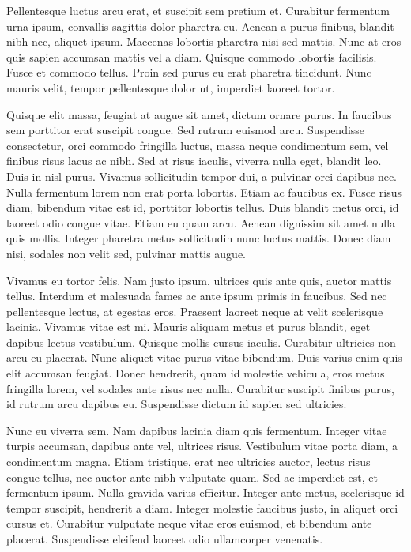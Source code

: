 \documentclass{icorsdssv2024}
\begin{document}
Pellentesque luctus arcu erat, et suscipit sem pretium et. Curabitur fermentum urna ipsum, convallis sagittis dolor pharetra eu. Aenean a purus finibus, blandit nibh nec, aliquet ipsum. Maecenas lobortis pharetra nisi sed mattis. Nunc at eros quis sapien accumsan mattis vel a diam. Quisque commodo lobortis facilisis. Fusce et commodo tellus. Proin sed purus eu erat pharetra tincidunt. Nunc mauris velit, tempor pellentesque dolor ut, imperdiet laoreet tortor.

Quisque elit massa, feugiat at augue sit amet, dictum ornare purus. In faucibus sem porttitor erat suscipit congue. Sed rutrum euismod arcu. Suspendisse consectetur, orci commodo fringilla luctus, massa neque condimentum sem, vel finibus risus lacus ac nibh. Sed at risus iaculis, viverra nulla eget, blandit leo. Duis in nisl purus. Vivamus sollicitudin tempor dui, a pulvinar orci dapibus nec. Nulla fermentum lorem non erat porta lobortis. Etiam ac faucibus ex. Fusce risus diam, bibendum vitae est id, porttitor lobortis tellus. Duis blandit metus orci, id laoreet odio congue vitae. Etiam eu quam arcu. Aenean dignissim sit amet nulla quis mollis. Integer pharetra metus sollicitudin nunc luctus mattis. Donec diam nisi, sodales non velit sed, pulvinar mattis augue.

Vivamus eu tortor felis. Nam justo ipsum, ultrices quis ante quis, auctor mattis tellus. Interdum et malesuada fames ac ante ipsum primis in faucibus. Sed nec pellentesque lectus, at egestas eros. Praesent laoreet neque at velit scelerisque lacinia. Vivamus vitae est mi. Mauris aliquam metus et purus blandit, eget dapibus lectus vestibulum. Quisque mollis cursus iaculis. Curabitur ultricies non arcu eu placerat. Nunc aliquet vitae purus vitae bibendum. Duis varius enim quis elit accumsan feugiat. Donec hendrerit, quam id molestie vehicula, eros metus fringilla lorem, vel sodales ante risus nec nulla. Curabitur suscipit finibus purus, id rutrum arcu dapibus eu. Suspendisse dictum id sapien sed ultricies.

Nunc eu viverra sem. Nam dapibus lacinia diam quis fermentum. Integer vitae turpis accumsan, dapibus ante vel, ultrices risus. Vestibulum vitae porta diam, a condimentum magna. Etiam tristique, erat nec ultricies auctor, lectus risus congue tellus, nec auctor ante nibh vulputate quam. Sed ac imperdiet est, et fermentum ipsum. Nulla gravida varius efficitur. Integer ante metus, scelerisque id tempor suscipit, hendrerit a diam. Integer molestie faucibus justo, in aliquet orci cursus et. Curabitur vulputate neque vitae eros euismod, et bibendum ante placerat. Suspendisse eleifend laoreet odio ullamcorper venenatis.
\end{document}
